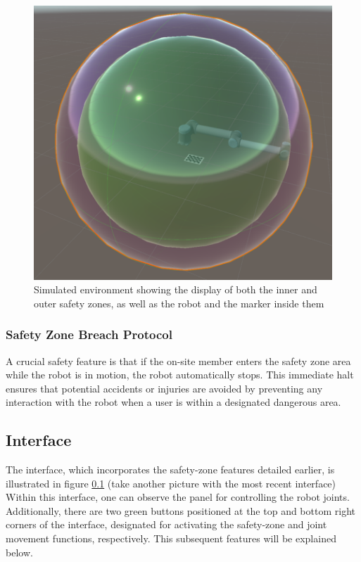         \begin{figure}[h]
            \centering
            \includegraphics[width=0.5\linewidth]{figs/dual-safetyzone-robot.png}
            \caption{Simulated environment showing the display of both the inner and outer safety zones, as well as the robot and the marker inside them}
            \label{fig:dual-safety}
        \end{figure}

        \subsubsection{Safety Zone Breach Protocol}

            A crucial safety feature is that if the on-site member enters the safety zone area while the robot is in motion, the robot 
            automatically stops. This immediate halt ensures that potential accidents or injuries are avoided by preventing any interaction 
            with the robot when a user is within a designated dangerous area.
                
    \subsection{Interface}

        The interface, which incorporates the safety-zone features detailed earlier, is illustrated in figure \ref{} (take another picture with the most recent interface) 
        Within this interface, one can observe the panel for controlling the robot joints. Additionally, there are two green buttons 
        positioned at the top and bottom right corners of the interface, designated for activating the safety-zone and joint movement functions, 
        respectively. This subsequent features will be explained below.

